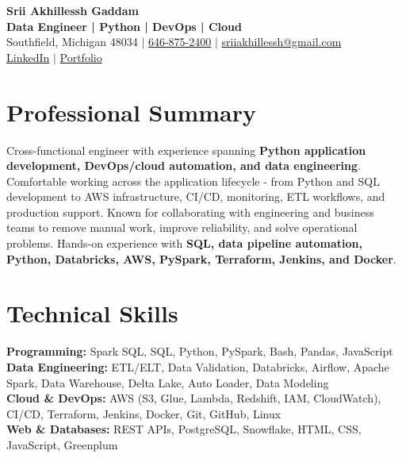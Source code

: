 \documentclass[letterpaper,10pt]{article}
\begin{document}
\fontsize{9.35pt}{10.45pt}\selectfont

\begin{center}
    {\LARGE \textbf{Srii Akhillessh Gaddam}} \\[-1pt]
    \textbf{Data Engineer | Python | DevOps | Cloud} \\[2pt]
    Southfield, Michigan 48034 $|$
    \href{tel:6468752400}{646-875-2400} $|$
    \href{mailto:sriiakhillessh@gmail.com}{sriiakhillessh@gmail.com} \\[1pt]
    \href{https://www.linkedin.com/in/srii-akhiilessh-gaddam-b48668191/}{LinkedIn} $|$
    \href{https://sriiakhillesshg.github.io/portfolio/}{Portfolio}
\end{center}
\vspace{-8pt}

\section{Professional Summary}
\small{Cross-functional engineer with experience spanning \textbf{Python application development, DevOps/cloud automation, and data engineering}. Comfortable working across the application lifecycle - from Python and SQL development to AWS infrastructure, CI/CD, monitoring, ETL workflows, and production support. Known for collaborating with engineering and business teams to remove manual work, improve reliability, and solve operational problems. Hands-on experience with \textbf{SQL, data pipeline automation, Python, Databricks, AWS, PySpark, Terraform, Jenkins, and Docker}.}

\section{Technical Skills}
\small{
\textbf{Programming:} Spark SQL, SQL, Python, PySpark, Bash, Pandas, JavaScript \\
\textbf{Data Engineering:} ETL/ELT, Data Validation, Databricks, Airflow, Apache Spark, Data Warehouse, Delta Lake, Auto Loader, Data Modeling \\
\textbf{Cloud \& DevOps:} AWS (S3, Glue, Lambda, Redshift, IAM, CloudWatch), CI/CD, Terraform, Jenkins, Docker, Git, GitHub, Linux \\
\textbf{Web \& Databases:} REST APIs, PostgreSQL, Snowflake, HTML, CSS, JavaScript, Greenplum
}
\end{document}
